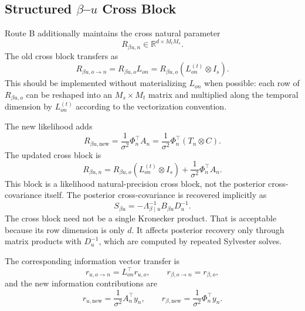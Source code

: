 \documentclass[12pt]{article}
\begin{document}
\subsection{Structured $\beta$--$u$ Cross Block}
\label{subsec:structured_beta_u_cross_block}

Route B additionally maintains the cross natural parameter
\begin{equation}
    R_{\beta u,n}\in\mathbb{R}^{d\times M_tM_s}.
\end{equation}
The old cross block transfers as
\begin{equation}
    R_{\beta u,o\rightarrow n}
    =
    R_{\beta u,o}L_{on}
    =
    R_{\beta u,o}(L_{on}^{(t)}\otimes I_s).
    \label{eq:cross_block_transfer_kron}
\end{equation}
This should be implemented without materializing $L_{on}$ when possible: each row of
$R_{\beta u,o}$ can be reshaped into an $M_s\times M_t$ matrix and multiplied along the
temporal dimension by $L_{on}^{(t)}$ according to the vectorization convention.

The new likelihood adds
\begin{equation}
    R_{\beta u,\mathrm{new}}
    =
    \frac{1}{\sigma^2}\Phi_n^\top A_n
    =
    \frac{1}{\sigma^2}\Phi_n^\top(T_n\otimes C).
    \label{eq:new_cross_block_likelihood}
\end{equation}
The updated cross block is
\begin{equation}
    R_{\beta u,n}
    =
    R_{\beta u,o}(L_{on}^{(t)}\otimes I_s)
    +
    \frac{1}{\sigma^2}\Phi_n^\top A_n.
    \label{eq:updated_cross_block}
\end{equation}
This block is a likelihood natural-precision cross block, not the posterior
cross-covariance itself. The posterior cross-covariance is recovered implicitly as
\begin{equation}
    S_{\beta u}
    =
    -\Lambda_{\beta\mid u}^{-1}B_{\beta u}D_u^{-1}.
    \label{eq:posterior_cross_covariance_implicit}
\end{equation}
The cross block need not be a single Kronecker product. That is acceptable because its row
dimension is only $d$. It affects posterior recovery only through matrix products with
$D_u^{-1}$, which are computed by repeated Sylvester solves.

The corresponding information vector transfer is
\begin{equation}
    r_{u,o\rightarrow n}=L_{on}^\top r_{u,o},
    \qquad
    r_{\beta,o\rightarrow n}=r_{\beta,o},
\end{equation}
and the new information contributions are
\begin{equation}
    r_{u,\mathrm{new}}=\frac{1}{\sigma^2}A_n^\top y_n,
    \qquad
    r_{\beta,\mathrm{new}}=\frac{1}{\sigma^2}\Phi_n^\top y_n.
\end{equation}
\end{document}
